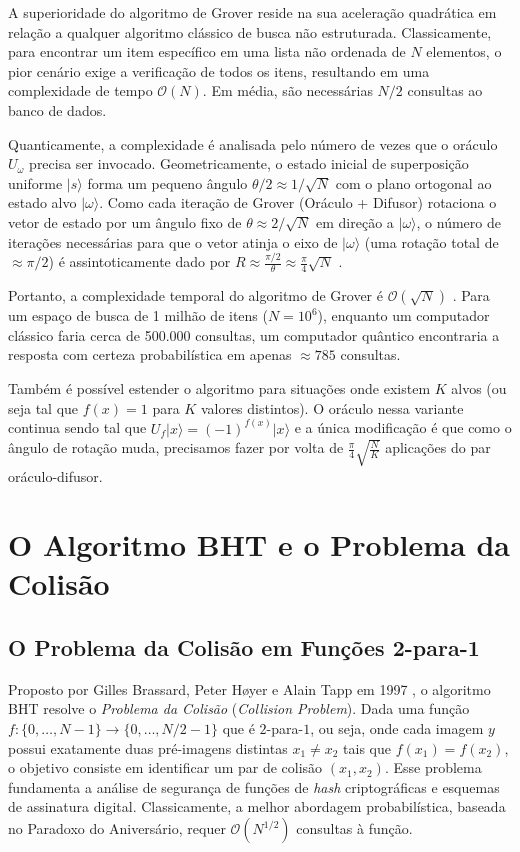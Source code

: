 \documentclass[12pt, a4paper]{article}
\newcommand{\ket}[1]{\lvert #1 \rangle}
\begin{document}
A superioridade do algoritmo de Grover reside na sua aceleração quadrática em relação a qualquer algoritmo clássico de busca não estruturada. Classicamente, para encontrar um item específico em uma lista não ordenada de $N$ elementos, o pior cenário exige a verificação de todos os itens, resultando em uma complexidade de tempo $\mathcal{O}(N)$. Em média, são necessárias $N/2$ consultas ao banco de dados.

Quanticamente, a complexidade é analisada pelo número de vezes que o oráculo $U_\omega$ precisa ser invocado. Geometricamente, o estado inicial de superposição uniforme $\ket{s}$ forma um pequeno ângulo $\theta/2 \approx 1/\sqrt{N}$ com o plano ortogonal ao estado alvo $\ket{\omega}$. Como cada iteração de Grover (Oráculo + Difusor) rotaciona o vetor de estado por um ângulo fixo de $\theta \approx 2/\sqrt{N}$ em direção a $\ket{\omega}$, o número de iterações necessárias para que o vetor atinja o eixo de $\ket{\omega}$ (uma rotação total de $\approx \pi/2$) é assintoticamente dado por $R \approx \frac{\pi/2}{\theta} \approx \frac{\pi}{4}\sqrt{N}$ \cite{grover1996fast, nielsen2010}.

Portanto, a complexidade temporal do algoritmo de Grover é $\mathcal{O}(\sqrt{N})$ \cite{nielsen2010}. Para um espaço de busca de 1 milhão de itens ($N = 10^6$), enquanto um computador clássico faria cerca de 500.000 consultas, um computador quântico encontraria a resposta com certeza probabilística em apenas $\approx 785$ consultas. 

Também é possível estender o algoritmo para situações onde existem $K$ alvos (ou seja tal que $f(x) = 1$ para $K$ valores distintos). O oráculo nessa variante continua sendo tal que $U_f \ket{x} = (-1)^{f(x)}\ket{x}$ e a única modificação é que como o ângulo de rotação muda, precisamos fazer por volta de $\frac{\pi}{4}\sqrt{\frac{N}{K}}$ aplicações do par oráculo-difusor.

\section{O Algoritmo BHT e o Problema da Colisão}

\subsection{O Problema da Colisão em Funções 2-para-1}

\begin{sloppypar}
Proposto por Gilles Brassard, Peter H{\o}yer e Alain Tapp em 1997 \cite{brassard1997quantum, nielsen2010}, o algoritmo BHT resolve o \textit{Problema da Colisão} (\textit{Collision Problem}). Dada uma função $f: \{0, \dots, N-1\} \to \{0, \dots, N/2 - 1\}$ que é $2$-para-$1$, ou seja, onde cada imagem $y$ possui exatamente duas pré-imagens distintas $x_1 \neq x_2$ tais que $f(x_1) = f(x_2)$, o objetivo consiste em identificar um par de colisão $(x_1, x_2)$. Esse problema fundamenta a análise de segurança de funções de \textit{hash} criptográficas e esquemas de assinatura digital. Classicamente, a melhor abordagem probabilística, baseada no Paradoxo do Aniversário, requer $\mathcal{O}(N^{1/2})$ consultas à função.
\end{sloppypar}
\end{document}
